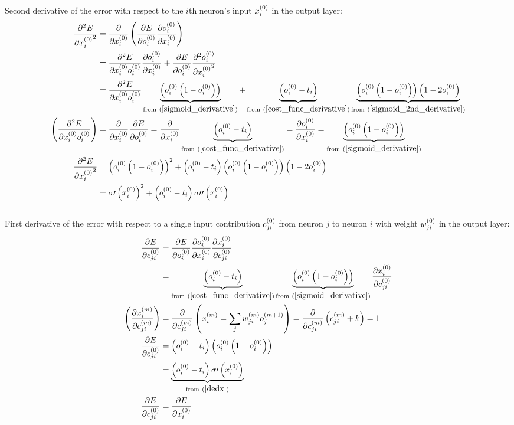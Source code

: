 \\[5pt]Second derivative of the error with respect to the $i$th neuron's input $x_{i}^{(0)}$ in the output layer:
\begin{align}
\pdv[2]{E}{{\Input i 0}} &= \pdv{}{\Input i 0}
\left(\pdv{E}{\Out i 0}\pdv{\Out i 0}{\Input i 0}\right) 
\\
&= \pdv{{^2}E}{{\Input i 0}{\Out i 0}}\pdv{\Out i 0}{\Input i 0} + \pdv{E}{\Out i 0}\pdv[2]{\Out i 0}{{\Input i 0}}
\\
&= \pdv{{^2}E}{{\Input i 0}{\Out i 0}}\underbrace{\left(\Out i 0 \left(1 - \Out i 0\right)\right)}_{{\text{from} \ (\ref{sigmoid_derivative})}} + \underbrace{\left(\Out i 0 - \Target i\right)}_{\text{from} \ (\ref{cost_func_derivative})}\underbrace{\left(\Out i 0 \left(1 - \Out i 0\right)\right)\left(1 - 2\Out i 0\right) }_{\text{from}\ (\ref{sigmoid_2nd_derivative})}
\\
\left(\pdv{{^2}E}{{\Input i 0}{\Out i 0}}\right) &= \pdv{}{\Input i 0}\pdv{E}{\Out i 0} = \pdv{}{\Input i 0}\underbrace{\left(\Out i 0 - \Target i\right)}_{\text{from} \ (\ref{cost_func_derivative})} = \pdv{\Out i 0}{\Input i 0} = \underbrace{\left(\Out i 0 \left(1 - \Out i 0\right)\right)}_{{\text{from} \ (\ref{sigmoid_derivative})}} 
\\
\pdv[2]{E}{{\Input i 0}}&= \left(\Out i 0 \left(1 - \Out i 0\right)\right)^2 + \left(\Out i 0 - \Target i\right)\left(\Out i 0 \left(1 - \Out i 0\right)\right)\left(1 - 2\Out i 0\right) 
\\
&= \sigma\prime\left(\Input i 0\right)^2 + \left(\Out i 0 - \Target i\right)\sigma\prime\prime\left(\Input i 0\right)\label{d2edx2}
\end{align}
\\[5pt]First derivative of the error with respect to a single input contribution $c_{ji}^{(0)}$ from neuron $j$ to neuron $i$ with weight $w_{ji}^{(0)}$ in the output layer:
\begin{align}
\pdv{E}{\Con j i 0} &= 
\pdv{E}{\Out i 0}
\pdv{\Out i 0}{\Input i 0}
\pdv{\Input i 0}{\Con j i 0}
\\
&= \underbrace{\left(\Out i 0 - \Target i \right)}_{\text{from} \ (\ref{cost_func_derivative})} \underbrace{\left(\Out i 0 \left(1 - \Out i 0\right) \right)}_{\text{from} \ (\ref{sigmoid_derivative})} \pdv{\Input i 0}{\Con j i 0} 
\\
\left( \pdv{\Input i m}{\Con j i m}\right) &= \pdv{}{\Con j i m}\left(\Input i m = \sum_j\Weight j i m\Out j {m+1} \right) = \pdv{}{\Con j i m} \left(\Con j i m + k \right) = 1\label{dxdc} 
\\
\pdv{E}{\Con j i 0}&= \left(\Out i 0 - \Target i \right) \left(\Out i 0 \left(1 - \Out i 0\right) \right)
\\
&= \underbrace{\left(\Out i 0 - \Target i \right) \sigma\prime\left(\Input i 0\right)\label{dedc}}
_{\text{from} \ (\ref{dedx})} 
\\
\pdv{E}{\Con j i 0} &= \pdv{E}{\Input i 0}
\end{align}
